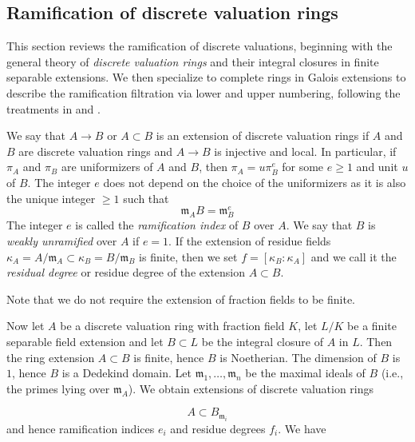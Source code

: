 \subsection{Ramification of discrete valuation rings}
This section reviews the ramification of discrete valuations, beginning with the general theory of \textit{discrete valuation rings} and their 
integral closures in finite separable extensions. 
We then specialize to complete rings in Galois extensions to describe the ramification filtration via lower and upper numbering, 
following the treatments in  and \cite{serreLF}.

\begin{definition}[\stackstag{09E4}]\label{definition:weakly_unramified_and_tamely_ramified_DVR:reorg}
    We say that $A \to B$ or $A \subset B$ is an extension of discrete valuation rings if $A$ and $B$ are discrete valuation rings and $A \to B$ is injective and local. In particular, if $\pi _ A$ and $\pi _ B$ are uniformizers of $A$ and $B$, then $\pi _ A = u \pi _ B^ e$ for some $e \geq 1$ and unit $u$ of $B$. The integer $e$ does not depend on the choice of the uniformizers as it is also the unique integer $\geq 1$ such that
\[ \mathfrak m_ A B = \mathfrak m_ B^ e \]
The integer $e$ is called the \textit{ramification index} of $B$ over $A$. We say that $B$ is \textit{weakly unramified} over $A$ if $e = 1$. 
If the extension of residue fields $\kappa _ A = A/\mathfrak m_ A \subset \kappa _ B = B/\mathfrak m_ B$ is finite, 
then we set $f = [\kappa _ B : \kappa _ A]$ and we call it the \textit{residual degree} or residue degree of the extension $A \subset B$.

Note that we do not require the extension of fraction fields to be finite.
\end{definition}

Now let $A$ be a discrete valuation ring with fraction field $K$, let  $L/K$ be a finite separable field extension and 
let $B \subset L$ be the integral closure of $A$ in $L$.
Then the ring extension $A \subset B$ is finite, hence $B$ is Noetherian. 
The dimension of $B$ is $1$, hence $B$ is a Dedekind domain.
Let $\mathfrak m_1, \ldots , \mathfrak m_ n$ be the maximal ideals of $B$ (i.e., the primes lying over $\mathfrak m_ A$). 
We obtain extensions of discrete valuation rings

\[ A \subset B_{\mathfrak m_ i} \]
and hence ramification indices $e_ i$ and residue degrees $f_ i$. We have


